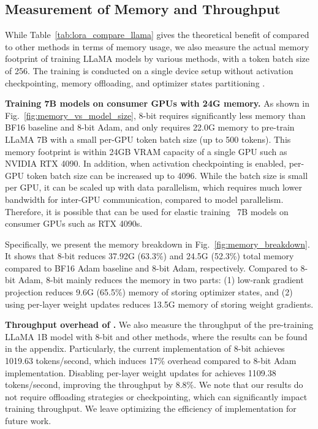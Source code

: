 

\subsection{Measurement of Memory and Throughput}
\label{sec:memory_measure}
While Table~\ref{tab:lora_compare_llama} gives the theoretical benefit of \lowrank{} compared to other methods in terms of memory usage, we also measure the actual memory footprint of training LLaMA models by various methods, with a token batch size of 256. 
The training is conducted on a single device setup without activation checkpointing, memory offloading, and optimizer states partitioning \citep{rajbhandariZeROMemoryOptimizations2020}.

\textbf{Training 7B models on consumer GPUs with 24G memory.} As shown in Fig.~\ref{fig:memory_vs_model_size}, 8-bit \lowrank{} requires significantly less memory than BF16 baseline and 8-bit Adam, and only requires 22.0G memory to pre-train LLaMA 7B with a small per-GPU token batch size (up to 500 tokens). This memory footprint is within 24GB VRAM capacity of a single GPU such as NVIDIA RTX 4090.
In addition, when activation checkpointing is enabled, per-GPU token batch size can be increased up to 4096. While the batch size is small per GPU, it can be scaled up with data parallelism, which requires much lower bandwidth for inter-GPU communication, compared to model parallelism. Therefore, it is possible that \lowrank{} can be used for elastic training~\cite{linDynamicMinibatchSGD2019} 7B models on consumer GPUs such as RTX 4090s. %

Specifically, we present the memory breakdown in Fig.~\ref{fig:memory_breakdown}.
It shows that 8-bit \lowrank{} reduces 37.92G (63.3\%) and 24.5G (52.3\%) total memory compared to BF16 Adam baseline and 8-bit Adam, respectively.
Compared to 8-bit Adam, 8-bit \lowrank{} mainly reduces the memory in two parts: (1) low-rank gradient projection reduces 9.6G (65.5\%) memory of storing optimizer states, and (2) using per-layer weight updates reduces 13.5G memory of storing weight gradients.

\textbf{Throughput overhead of \lowrank{}.} We also measure the throughput of the pre-training LLaMA 1B model with 8-bit \lowrank{} and other methods, where the results can be found in the appendix.
Particularly, the current implementation of 8-bit \lowrank{} achieves 1019.63 tokens/second, which induces 17\% overhead compared to 8-bit Adam implementation. 
Disabling per-layer weight updates for \lowrank{} achieves 1109.38 tokens/second, improving the throughput by 8.8\%. We note that our results do not require offloading strategies or checkpointing, which can significantly impact training throughput. 
We leave optimizing the efficiency of \lowrank{} implementation for future work.





